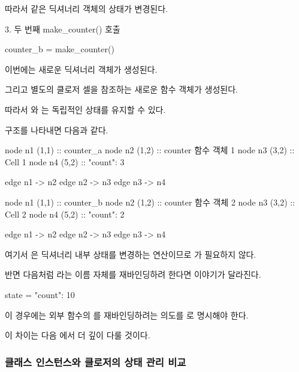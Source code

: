 따라서 같은 딕셔너리 객체의 상태가 변경된다.

\begin{dhknote}
\begin{dhksmry}[centered]
3. 두 번째 make_counter() 호출
\end{dhksmry}
\end{dhknote}

\begin{dhkcode}
counter_b = make_counter()
\end{dhkcode}

이번에는 새로운 딕셔너리 객체가 생성된다.

그리고 별도의 클로저 셀을 참조하는 새로운  함수 객체가 생성된다.

따라서 와 는 독립적인 상태를 유지할 수 있다.

구조를 나타내면 다음과 같다.

\begin{dhkdiagram}[in=6]
node n1 (1,1) :: counter_a
node n2 (1,2) :: counter 함수 객체 1
node n3 (3,2) :: Cell 1
node n4 (5,2) :: {"count": 3}

edge n1 -> n2
edge n2 -> n3
edge n3 -> n4
\end{dhkdiagram}

\begin{dhkdiagram}[in=6]
node n1 (1,1) :: counter_b
node n2 (1,2) :: counter 함수 객체 2
node n3 (3,2) :: Cell 2
node n4 (5,2) :: {"count": 2}

edge n1 -> n2
edge n2 -> n3
edge n3 -> n4
\end{dhkdiagram}

여기서 은 딕셔너리 내부 상태를 변경하는 연산이므로 가 필요하지 않다.

반면 다음처럼 라는 이름 자체를 재바인딩하려 한다면 이야기가 달라진다.

\begin{dhkcode}
state = {"count": 10}
\end{dhkcode}

이 경우에는 외부 함수의 를 재바인딩하려는 의도를 로 명시해야 한다.

이 차이는 다음 에서 더 깊이 다룰 것이다.

\subsubsection{클래스 인스턴스와 클로저의 상태 관리 비교}

